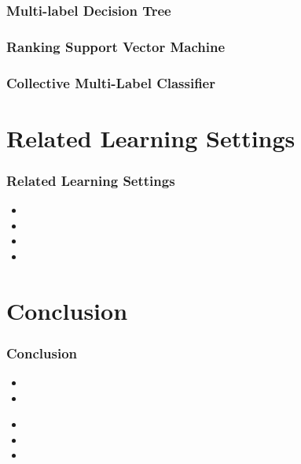 \documentclass{beamer}
\begin{document}
\begin{frame}
	\frametitle{Multi-label Decision Tree}

\end{frame}
\begin{frame}
\frametitle{Ranking Support Vector Machine}

\end{frame}
\begin{frame}
\frametitle{Collective Multi-Label Classifier}

\end{frame}
\section{Related Learning Settings}

\begin{frame}
	\frametitle{Related Learning Settings}
	\begin{itemize}
		\item 
		\item 
		\item 
		\item 
	\end{itemize}
\end{frame}

\section{Conclusion}
\begin{frame}
	\frametitle{Conclusion}
	\begin{itemize}
		\item 
		\item 
	\end{itemize}
\begin{itemize}
		\item <5-> 
		\item <6->
		\item <7-> 
	\end{itemize}
\end{frame}
\end{document}
